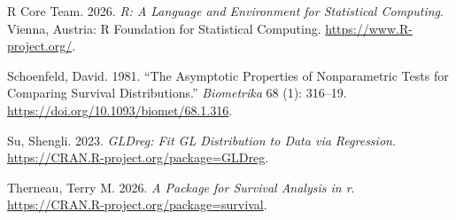 \documentclass[
  letterpaper,
  DIV=11,
  numbers=noendperiod]{scrartcl}
\newlength{\cslhangindent}
\newenvironment{CSLReferences}[2] %
 {\begin{list}{}{%
  \setlength{\itemindent}{0pt}
  \setlength{\leftmargin}{0pt}
  \setlength{\parsep}{0pt}
  \ifodd #1
   \setlength{\leftmargin}{\cslhangindent}
   \setlength{\itemindent}{-1\cslhangindent}
  \fi
  \setlength{\itemsep}{#2\baselineskip}}}
 {\end{list}}
\begin{document}
\begin{CSLReferences}{1}{0}
R Core Team. 2026. \emph{R: A Language and Environment for Statistical
Computing}. Vienna, Austria: R Foundation for Statistical Computing.
\url{https://www.R-project.org/}.

Schoenfeld, David. 1981. {``The Asymptotic Properties of Nonparametric
Tests for Comparing Survival Distributions.''} \emph{Biometrika} 68 (1):
316--19. \url{https://doi.org/10.1093/biomet/68.1.316}.

Su, Shengli. 2023. \emph{{GLDreg}: Fit {GL} Distribution to Data via
Regression}. \url{https://CRAN.R-project.org/package=GLDreg}.

Therneau, Terry M. 2026. \emph{A Package for Survival Analysis in r}.
\url{https://CRAN.R-project.org/package=survival}.

\end{CSLReferences}
\end{document}
